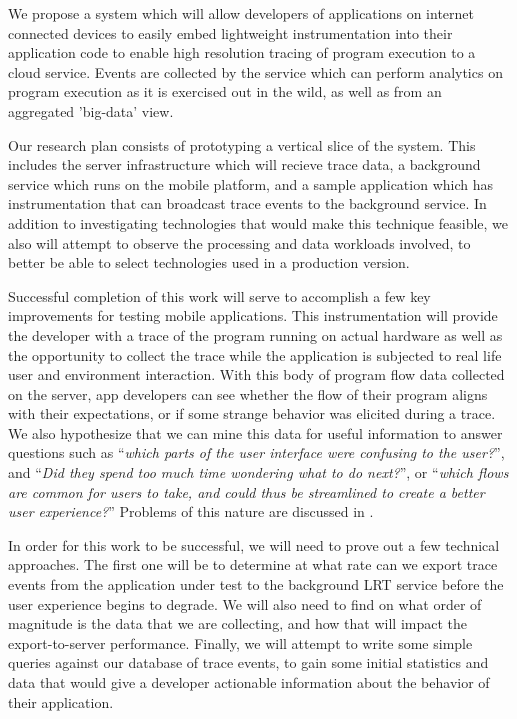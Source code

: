 \documentclass{acm_proc_article-sp}
\begin{document}
We propose a system which will allow developers of applications on internet connected 
devices to easily embed lightweight instrumentation 
into their application code to enable high resolution 
tracing of program execution to a cloud service. Events are collected by 
the service which can perform analytics on program execution as it is 
exercised out in the wild, as well as from an aggregated 'big-data' view.

Our research plan consists of prototyping a vertical slice of the system.
This includes the server infrastructure which will recieve trace data,
a background service which runs on the mobile platform, and a sample
application which has instrumentation that can broadcast trace events to the background service.
In addition to investigating technologies that would make this technique 
feasible, we also will attempt to observe the processing and data workloads
involved, to better be able to select technologies used in a production version.

Successful completion of this work will serve to accomplish a few key 
improvements for testing mobile applications. This instrumentation will provide 
the developer with a trace of the program running on actual hardware as well as 
the opportunity to collect the trace while the application is 
subjected to real life user and environment interaction. With this 
body of program flow data collected on the server, app developers can see
whether the flow of their program aligns with their expectations, or if some strange
behavior was elicited during a trace. We also hypothesize that we can mine this data for useful 
information to answer questions such as ``\emph{which parts of the user interface were 
confusing to the user?}'', and ``\emph{Did they spend too much time wondering what to do 
next?}'', or ``\emph{which flows are common for users to take, and could thus be 
streamlined to create a better user experience?}'' Problems of this nature are 
discussed in \cite{WebAntiPattern}. 

In order for this work to be successful, we will need to 
prove out a few technical approaches. The first one will be to determine at what rate can we
export trace events from the application under test to the background LRT service 
before the user experience begins to degrade. 
We will also need to find on what order of magnitude is the data
that we are collecting, and how that will impact the export-to-server performance.
Finally, we will attempt to write some simple queries against our database of
trace events, to gain some initial statistics and data that would give a developer
actionable information about the behavior of their application.
\end{document}
